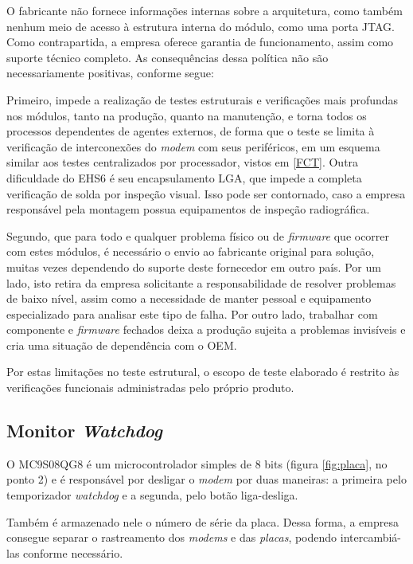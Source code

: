         O fabricante não fornece informações internas sobre a arquitetura, como também nenhum meio de acesso à estrutura interna do módulo, como uma porta JTAG. Como contrapartida, a empresa oferece garantia de funcionamento, assim como suporte técnico completo. As consequências dessa política não são necessariamente positivas, conforme segue:
        
        Primeiro, impede a realização de testes estruturais e verificações mais profundas nos módulos, tanto na produção, quanto na manutenção, e torna todos os processos dependentes de agentes externos, de forma que o teste se limita à verificação de interconexões do \textit{modem} com seus periféricos, em um esquema similar aos testes centralizados por processador, vistos em \ref{FCT}. Outra dificuldade do EHS6 é seu encapsulamento LGA, que impede a completa verificação de solda por inspeção visual. Isso pode ser contornado, caso a empresa responsável pela montagem possua equipamentos de inspeção radiográfica.
        
        Segundo, que para todo e qualquer problema físico ou de \textit{firmware} que ocorrer com estes módulos, é necessário o envio ao fabricante original para solução, muitas vezes dependendo do suporte deste fornecedor em outro país. Por um lado, isto retira da empresa solicitante a responsabilidade de resolver problemas de baixo nível, assim como a necessidade de manter pessoal e equipamento especializado para analisar este tipo de falha. Por outro lado, trabalhar com componente e \textit{firmware} fechados deixa a produção sujeita a problemas invisíveis e cria uma situação de dependência com o OEM.
        
        Por estas limitações no teste estrutural, o escopo de teste elaborado é restrito às verificações funcionais administradas pelo próprio produto. 
        
    \subsection{Monitor \textit{Watchdog}}
    
        O MC9S08QG8 é um microcontrolador simples de 8 bits (figura \ref{fig:placa}, no ponto 2) e é  responsável por desligar o \textit{modem} por duas maneiras: a primeira pelo temporizador \textit{watchdog} e a segunda, pelo botão liga-desliga. 
        
        Também é armazenado nele o número de série da placa. Dessa forma, a empresa consegue separar o rastreamento dos \textit{modems} e das \emph{placas}, podendo intercambiá-las conforme necessário.
        
